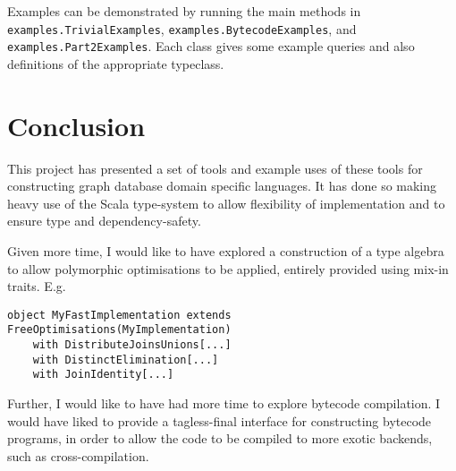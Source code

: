 \documentclass{report}
\newcommand \2[0]{\textbf{2}}
\newcommand \3[0]{\textbf{3}}
\begin{document}
Examples can be demonstrated by running the main methods in \texttt{examples.TrivialExamples}, \texttt{examples.BytecodeExamples}, and \texttt{examples.Part2Examples}. Each class gives some example queries and also definitions of the appropriate typeclass.


\chapter{Conclusion}
This project has presented a set of tools and example uses of these tools for constructing graph database domain specific languages. It has done so making heavy use of the Scala type-system to allow flexibility of implementation and to ensure type and dependency-safety.

Given more time, I would like to have explored a construction of a type algebra to allow polymorphic optimisations to be applied, entirely provided using mix-in traits. E.g.

\begin{verbatim}
object MyFastImplementation extends FreeOptimisations(MyImplementation) 
    with DistributeJoinsUnions[...]
    with DistinctElimination[...]
    with JoinIdentity[...]
\end{verbatim}

Further, I would like to have had more time to explore bytecode compilation. I would have liked to provide a tagless-final interface for constructing bytecode programs, in order to allow the code to be compiled to more exotic backends, such as cross-compilation.
    
\end{document}
